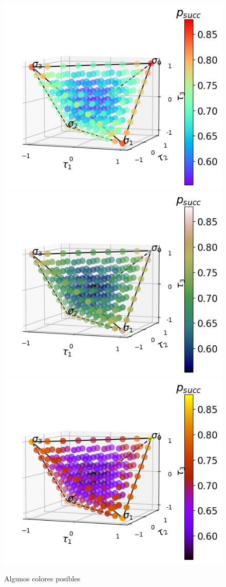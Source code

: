 \documentclass[10pt,letterpaper]{article} %
\begin{document}
\begin{figure}
\includegraphics[width=.32\columnwidth]{images/tetra-col13.png}
\includegraphics[width=.32\columnwidth]{images/tetra-col14.png}
\includegraphics[width=.32\columnwidth]{images/tetra-col16.png}\\[1ex]
\caption{Algunos colores posibles }
\end{figure}
\end{document}
